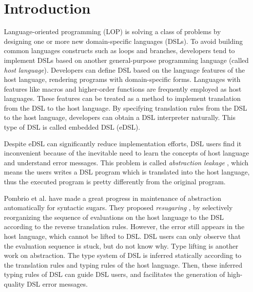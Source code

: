 \section{Introduction}

Language-oriented programming (LOP) \cite{LOP} is solving a class of problems by designing one or more new domain-specific languages (DSLs).
To avoid building common languages constructs such as loops and branches,
developers tend to implement DSLs based on another general-purpose programming language (called \textit{host language}).
Developers can define DSL based on the language features of the host language, rendering programs with domain-specific forms.
Languages with features like macros and higher-order functions are frequently employed as host languages\cite{macro-dsl,macro-dsl-2}.
These features can be treated as a method to implement translation from the DSL to the host language.
By specifying translation rules from the DSL to the host language, developers can obtain a DSL interpreter naturally.
This type of DSL is called embedded DSL (eDSL).

Despite eDSL can significantly reduce implementation efforts, DSL users find it inconvenient because of the inevitable need to learn the concepts of host language and understand error messages.
This problem is called \textit{abstraction leakage} \cite{Abstraction},
 which means the users writes a DSL program which is translated into the host language,
 thus the executed program is pretty differently from the original program.

Pombrio et al. have made a great progress in maintenance of abstraction automatically for syntactic sugars.
They proposed \textit{resugaring} \cite{resugar}, by selectively reorganizing the sequence of evaluations on the host language to the DSL according to the reverse translation rules.
However, the error still appears in the host language, which cannot be lifted to DSL.
DSL users can only observe that the evaluation sequence is stuck, but do not know why. 
Type lifting \cite{infer-types} is another work on abstraction.
The type system of DSL is inferred statically according to the translation rules and typing rules of the host language.
Then, these inferred typing rules of DSL can guide DSL users,
 and facilitates the generation of high-quality DSL error messages.


